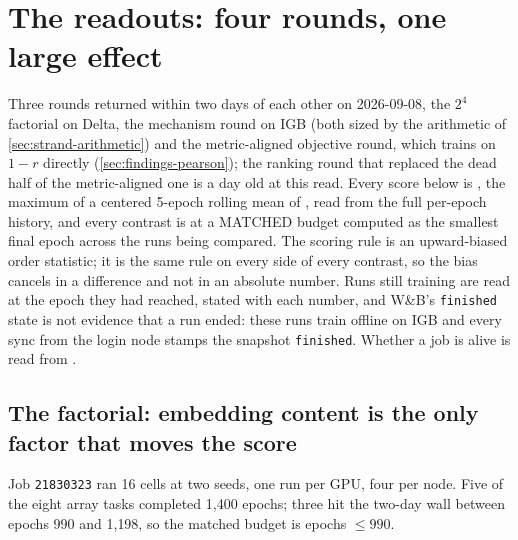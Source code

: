 
\section{The readouts: four rounds, one large effect}
\label{sec:readouts}

Three rounds returned within two days of each other on 2026-09-08, the $2^4$ factorial on
Delta, the mechanism round on IGB (both sized by the arithmetic of
\cref{sec:strand-arithmetic}) and the metric-aligned objective round, which trains on
$1 - r$ directly (\cref{sec:findings-pearson}); the ranking round that replaced the dead
half of the metric-aligned one is a day old at this read. Every score below is
, the maximum of a centered 5-epoch rolling mean of
, read from the full per-epoch history, and every
contrast is at a MATCHED budget computed as the smallest final epoch across the runs being
compared. The scoring rule is an upward-biased order statistic; it is the same rule on every
side of every contrast, so the bias cancels in a difference and not in an absolute number.
Runs still training are read at the epoch they had reached, stated with each number, and
W\&B's \texttt{finished} state is not evidence that a run ended: these runs train offline
on IGB and every sync from the login node stamps the snapshot \texttt{finished}. Whether a
job is alive is read from .

\subsection{The factorial: embedding content is the only factor that moves the score
}
\label{sec:readouts-factorial}

Job \texttt{21830323} ran 16 cells at two seeds, one run per GPU, four per node. Five of
the eight array tasks completed 1{,}400 epochs; three hit the two-day wall between epochs
990 and 1{,}198, so the matched budget is epochs $\le 990$.

